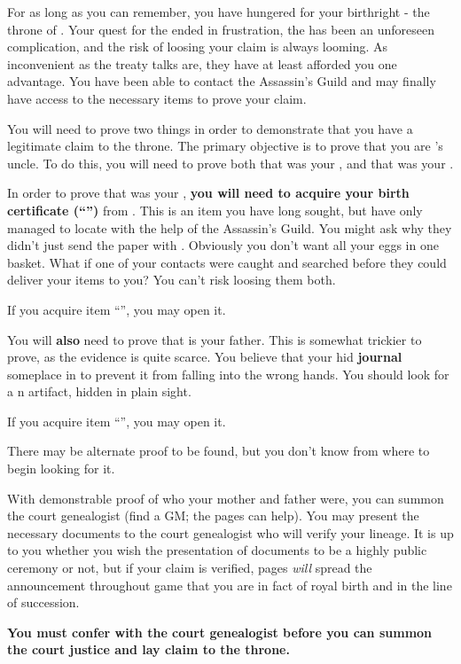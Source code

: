 \documentclass[green]{NeptuneBall}
\begin{document}
\name{\gLineage{}}

For as long as you can remember, you have hungered for your birthright - the throne of \pAtlantis{}.  Your quest for the \iTrident{} ended in frustration, the \iMusicBox{} has been an unforeseen complication, and the risk of loosing your claim is always looming. 
As inconvenient as the treaty talks are, they have at least afforded you one advantage. You have been able to contact the Assassin's Guild and may finally have access to the necessary items to prove your claim.

You will need to prove two things in order to demonstrate that you have a legitimate claim to the throne. The primary objective is to prove that you are \cKing{\King} \cKing{}'s uncle. To do this, you will need to prove both that \cMother{} was your \cMother{\parent}, and that \cExExKing{} was your \cExExKing{\parent}.

In order to prove that \cMother{} was your \cMother{\parent}, {\bf you will need to acquire your birth certificate (``\iBirthCertificate{}'')} from \cDiplomat{}. This is an item you have long sought, but have only managed to locate with the help of the Assassin's Guild. You might ask why they didn't just send the paper with \cSpy{}. Obviously you don't want all your eggs in one basket. What if one of your contacts were caught and searched before they could deliver your items to you? You can't risk loosing them both.

If you acquire item ``\iBirthCertificate{}'', you may open it.

You will {\bf also} need to prove that \cExExKing{} is your father. This is somewhat trickier to prove, as the evidence is quite scarce. You believe that your \cMother{\parent} hid {\bf \cMother{\their} journal} someplace in \pAtlantis{} to prevent it from falling into the wrong hands. You should look for a \pPacifica{}n artifact, hidden in plain sight.

If you acquire item ``\iJournal{}'', you may open it.

There may be alternate proof to be found, but you don't know from where to begin looking for it.

With demonstrable proof of who your mother and father were, you can summon the court genealogist (find a GM; the pages can help). You may present the necessary documents to the court genealogist who will verify your lineage. It is up to you whether you wish the presentation of documents to be a highly public ceremony or not, but if your claim is verified, pages \emph{will} spread the announcement throughout game that you are in fact of royal birth and in the line of succession.

{\bf You must confer with the court genealogist before you can summon the court justice and lay claim to the throne.}
\end{document}
